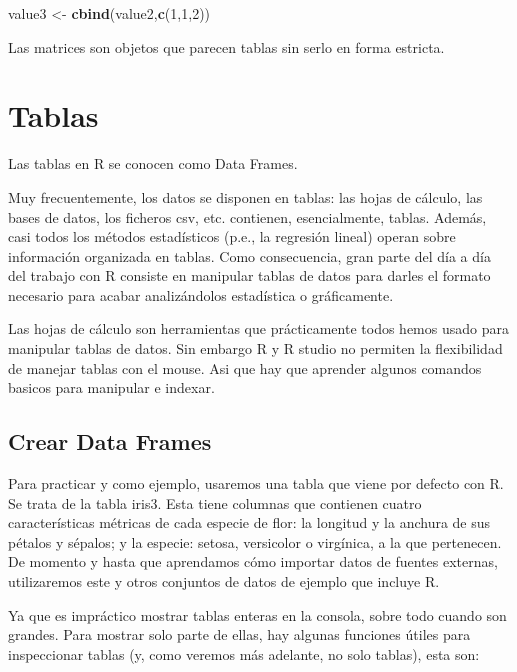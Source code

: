 \documentclass[
]{book}
\newenvironment{Shaded}{\begin{snugshade}}{\end{snugshade}}
\newcommand{\DecValTok}[1]{\textcolor[rgb]{0.00,0.00,0.81}{#1}}
\newcommand{\KeywordTok}[1]{\textcolor[rgb]{0.13,0.29,0.53}{\textbf{#1}}}
\newcommand{\NormalTok}[1]{#1}
\newcommand{\StringTok}[1]{\textcolor[rgb]{0.31,0.60,0.02}{#1}}
\begin{document}
\begin{Shaded}
\begin{Highlighting}[]
\NormalTok{value3 <-}\StringTok{ }\KeywordTok{cbind}\NormalTok{(value2,}\KeywordTok{c}\NormalTok{(}\DecValTok{1}\NormalTok{,}\DecValTok{1}\NormalTok{,}\DecValTok{2}\NormalTok{))}
\end{Highlighting}
\end{Shaded}

Las matrices son objetos que parecen tablas sin serlo en forma estricta.

\hypertarget{tablas}{%
\chapter{Tablas}\label{tablas}}

Las tablas en R se conocen como Data Frames.

Muy frecuentemente, los datos se disponen en tablas: las hojas de cálculo, las bases de datos, los ficheros csv, etc. contienen, esencialmente, tablas. Además, casi todos los métodos estadísticos (p.e., la regresión lineal) operan sobre información organizada en tablas. Como consecuencia, gran parte del día a día del trabajo con R consiste en manipular tablas de datos para darles el formato necesario para acabar analizándolos estadística o gráficamente.

Las hojas de cálculo son herramientas que prácticamente todos hemos usado para manipular tablas de datos. Sin embargo R y R studio no permiten la flexibilidad de manejar tablas con el mouse. Asi que hay que aprender algunos comandos basicos para manipular e indexar.

\hypertarget{crear-data-frames}{%
\section{Crear Data Frames}\label{crear-data-frames}}

Para practicar y como ejemplo, usaremos una tabla que viene por defecto con R. Se trata de la tabla iris3. Esta tiene columnas que contienen cuatro características métricas de cada especie de flor: la longitud y la anchura de sus pétalos y sépalos; y la especie: setosa, versicolor o virgínica, a la que pertenecen. De momento y hasta que aprendamos cómo importar datos de fuentes externas, utilizaremos este y otros conjuntos de datos de ejemplo que incluye R.

Ya que es impráctico mostrar tablas enteras en la consola, sobre todo cuando son grandes. Para mostrar solo parte de ellas, hay algunas funciones útiles para inspeccionar tablas (y, como veremos más adelante, no solo tablas), esta son:
\end{document}
